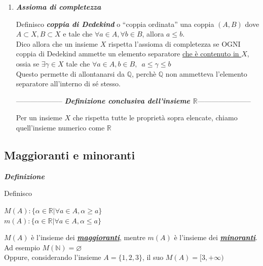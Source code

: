 \documentclass{article}
\theoremstyle{definition}
\newcommand{\virgolette}[1]{``#1''}
\begin{document}
\begin{enumerate}
\begin{center}
    Osservazione
\end{center}
Sino ad ora, tutte le proprietà elencate sono rispettate anche dall'insieme numerico $\mathbb{Q}$, dunque manca ancora la parte fondamentale per definire l'insieme $\mathbb{R}$
\item \begin{center}
    \textbf{\textit{Assioma  di completezza}}
\end{center}
Definisco \textbf{\textit{coppia di Dedekind}} o \virgolette{coppia ordinata} una coppia $(A,B)$ dove $A \subset X, B \subset X$ e tale che $\forall a \in A, \forall b \in B$, allora $a \leqslant b$.
\\
Dico allora che un insieme $X$ rispetta l'assioma di completezza se OGNI coppia di Dedekind ammette un elemento separatore \underline{che è contenuto in $X$}, ossia se $\exists \gamma \in X$ tale che $\forall a \in A, b \in B, \,\,\, a \leqslant \gamma \leqslant b$
\\Questo permette di allontanarsi da $\mathbb{Q}$, perchè $\mathbb{Q}$ non ammetteva l'elemento separatore all'interno di sé stesso.

\begin{center}
  --------------------\textbf{\textit{ Definizione conclusiva dell'insieme $\mathbb{R}$}}-----------------------
\end{center}
Per un insieme $X$ che rispetta tutte le proprietà sopra elencate, chiamo quell'insieme numerico come $\mathbb{R}$
\end{enumerate}

\subsection{Maggioranti e minoranti}
\begin{center}
    \textbf{\textit{Definizione}}
\end{center}
Definisco
\begin{center}
    $M(A):\{\alpha \in \mathbb{R} | \forall a \in A, \alpha \geqslant a\}$
    \\ $m(A):\{\alpha \in \mathbb{R} | \forall a \in A, \alpha \leqslant a\}$
    \end{center}
    $M(A)$ è l'insieme dei \textbf{\textit{\underline{maggioranti}}}, mentre $m(A)$ è l'insieme dei \textbf{\textit{\underline{minoranti}}}.
    \\ Ad esempio $M(\mathbb{N})=\varnothing$
    \\Oppure, considerando l'insieme $A=\{1,2,3\}$, il suo $M(A)=[3,+\infty)$
\end{document}

